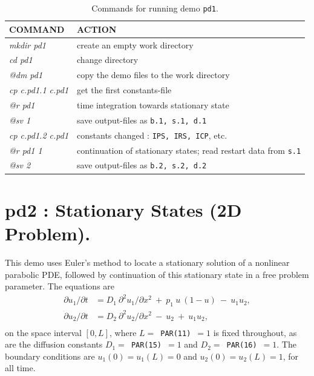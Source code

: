 \documentclass[12pt]{report}
\begin{document}
\begin{table}[htbp]
\begin{center}
\begin{tabular}{| l | l |}
\hline
  COMMAND  & ACTION \\
\hline
  {\it mkdir pd1} & create an empty work directory \\ 
  {\it cd pd1} & change directory \\
  {\it @dm pd1} & copy the demo files to the work directory \\
\hline
  {\it cp c.pd1.1 c.pd1} & get the first constants-file \\ 
  {\it @r pd1} & time integration towards stationary state \\ 
  {\it @sv 1} & save output-files as {\tt b.1, s.1, d.1} \\ 
\hline
  {\it cp c.pd1.2 c.pd1} & constants changed : {\tt IPS, IRS, ICP}, etc.  \\ 
  {\it @r pd1 1} & continuation of stationary states; read restart data from {\tt s.1} \\ 
  {\it @sv 2} & save output-files as {\tt b.2, s.2, d.2} \\ 
\hline
\end{tabular}
\caption{Commands for running demo {\tt pd1}.}
\label{tbl:demo_pd1}
\end{center}
\end{table}

\newpage
\section{ pd2 : Stationary States (2D Problem).} \label{sec:Demos_pd2}
This demo uses Euler's method to locate a stationary solution of
a nonlinear parabolic PDE, followed by continuation of this stationary
state in a free problem parameter. The equations are
\begin{equation} \begin{array}{cl}
  {\partial u_1 / \partial t} &= D_1~{\partial^2 u_1 / \partial x^2}
  ~+~  p_1~ u ~( 1-u) ~-~ u_1 u_2 , \\
  {\partial u_2 / \partial t} 
  &= D_2~{\partial^2 u_2 / \partial x^2} ~-~ u_2 ~+~ u_1 u_2 , \\
\end{array} \end{equation}
on the space interval $[0,L]$, where $L=$~{\tt PAR(11)}~$=1$ is fixed throughout,
as are the diffusion constants $D_1=$~{\tt PAR(15)}~$=1$ and $D_2=$~{\tt PAR(16)}~$=1$.
The boundary conditions are $u_1(0) = u_1(L) = 0$ and $u_2(0) = u_2(L) = 1$,
for all time.
\end{document}
